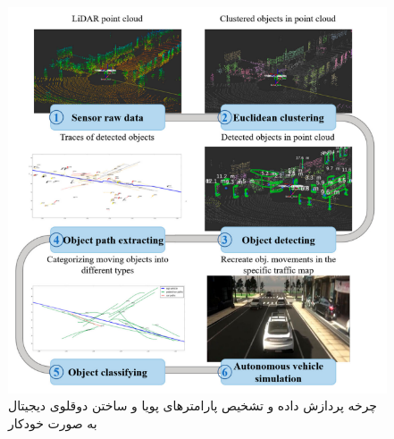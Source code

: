 \begin{figure}[h]
	\centering
	\includegraphics[scale=0.87]{figures/Automatic_DT_Creation_Cycle.png}
	\caption{  چرخه پردازش داده و تشخیص پارامترهای پویا و ساختن دوقلوی دیجیتال به صورت خودکار \cite{wang2022automatic}}
	\label{fig:automatic_dt_creation_cycle}
\end{figure}

